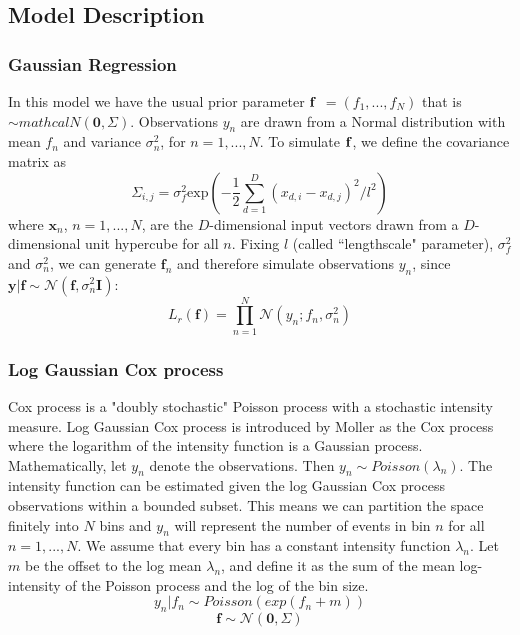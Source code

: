 \documentclass{article}
\begin{document}
\subsection{Model Description}
\subsubsection{Gaussian Regression}

In this model we have the usual prior parameter $\bf{f}$ $= (f_1,...,f_N)$ that is $\sim{ mathcal{N(\mathbf{0},\Sigma)}}$. Observations $y_n$ are drawn from a Normal distribution with mean $f_n$ and variance $\sigma_n^2$, for $n = 1,...,N$. To simulate $\bf{f}$, we define the covariance matrix as
\begin{equation}\label{covmat}
\Sigma_{i,j} = \sigma_{f}^{2}\text{exp}\left(-\frac{1}{2}\sum_{d=1}^{D}(x_{d,i} - x_{d,j})^2/l^2\right)
\end{equation}
where $\mathbf{x}_n$, $n = 1,...,N$, are the $D$-dimensional input vectors drawn from a $D$-dimensional unit hypercube for all $n$.
Fixing $l$ (called ``lengthscale" parameter), $\sigma_{f}^2$ and $\sigma_{n}^2$, we can generate $\mathbf{f}_n$ and therefore simulate observations $y_n$, since $\mathbf{y}|\mathbf{f}\sim\mathcal{N}\left(\mathbf{f},\sigma_n^2\mathbf{I}\right)$:
\begin{equation}
L_r(\mathbf{f}) = \prod_{n=1}^{N} \mathcal{N}(y_n;f_n,\sigma_n^2)
\end{equation}


\subsubsection{Log Gaussian Cox process}
  Cox process is a "doubly stochastic" Poisson process with a stochastic intensity measure.
  Log Gaussian Cox process is introduced by Moller \cite{Moller}
  as the Cox process where the logarithm of the intensity function is a Gaussian process. Mathematically, let $y_n$ denote the observations. Then $y_n \sim{Poisson(\lambda_n)}$. The intensity function can be estimated given the log Gaussian Cox process observations within a bounded subset. This means we can partition the space finitely into $N$ bins and $y_n$ will represent the number of events in bin $n$ for all $n = 1,...,N$. We assume that every bin has a constant intensity function $\lambda_n$. Let $m$ be the offset to the log mean $\lambda_n$, and define it as the sum of the mean log-intensity of the Poisson process and the log of the bin size.
  \begin{equation}
  y_n|f_n \sim{Poisson(exp(f_n + m))}
  \end{equation}
  \begin{equation}
  \mathbf{f} \sim\mathcal{N}(\mathbf{0},\Sigma)
  \end{equation}
\end{document}
